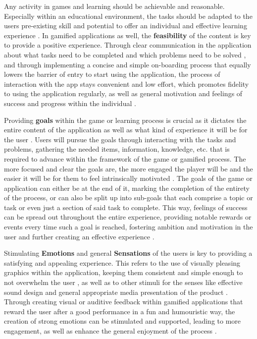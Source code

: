 Any activity in games and learning should be achievable and reasonable. Especially within an educational environment, the tasks should be adapted to the users pre-existing skill and potential to offer an individual and effective learning experience \cite{edu}. In gamified applications as well, the \textbf{feasibility} of the content is key to provide a positive experience. Through clear communication in the application about what tasks need to be completed and which problems need to be solved \cite{engage}, and through implementing a concise and simple on-boarding process that equally lowers the barrier of entry to start using the application, the process of interaction with the app stays convenient and low effort, which promotes fidelity to using the application regularly, as well as general motivation and feelings of success and progress within the individual \cite{fail}.

Providing \textbf{goals} within the game or learning process is crucial as it dictates the entire content of the application as well as what kind of experience it will be for the user \cite{model}. Users will pursue the goals through interacting with the tasks and problems, gathering the needed items, information, knowledge, etc. that is required to advance within the framework of the game or gamified process. The more focused and clear the goals are, the more engaged the player will be and the easier it will be for them to feel intrinsically motivated \cite{engage}. The goals of the game or application can either be at the end of it, marking the completion of the entirety of the process, or can also be split up into sub-goals that each comprise a topic or task or even just a section of said task to complete. This way, feelings of success can be spread out throughout the entire experience, providing notable rewards or events every time such a goal is reached, fostering ambition and motivation in the user and further creating an effective experience \cite{lifelong}.

Stimulating \textbf{Emotions} and general \textbf{Sensations} of the users is key to providing a satisfying and appealing experience. This refers to the use of visually pleasing graphics within the application, keeping them consistent and simple enough to not overwhelm the user \cite{fail}, as well as to other stimuli for the senses like effective sound design and general appropriate media presentation of the product \cite{model}. Through creating visual or auditive feedback within gamified applications that reward the user after a good performance in a fun and humouristic way, the creation of strong emotions can be stimulated and supported, leading to more engagement, as well as enhance the general enjoyment of the process \cite{fail}.

